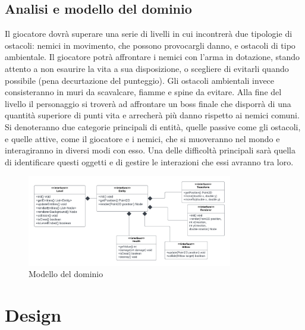 \documentclass[a4paper,12pt]{report}
\begin{document}
\section{Analisi e modello del dominio}
Il giocatore dovrà superare una serie di livelli in cui incontrerà due tipologie di ostacoli: nemici in movimento, che possono provocargli danno, e ostacoli di tipo ambientale.
Il giocatore potrà affrontare i nemici con l'arma in dotazione, stando attento a non esaurire la vita a sua disposizione, o scegliere di evitarli quando possibile (pena decurtazione del punteggio).
Gli ostacoli ambientali invece consisteranno in muri da scavalcare, fiamme e spine da evitare.
Alla fine del livello il personaggio si troverà ad affrontare un boss finale che disporrà di una quantità superiore di punti vita e arrecherà più danno rispetto ai nemici comuni.
Si denoteranno due categorie principali di entità, quelle passive come gli ostacoli, e quelle attive, come il giocatore e i nemici, che si muoveranno nel mondo e interagiranno in diversi modi con esso. Una delle difficoltà principali sarà quella di identificare questi oggetti e di gestire le interazioni che essi avranno tra loro.

\begin{figure}[ht]
\includegraphics[width=0.8\textwidth]{umlModello.png}
\caption{Modello del dominio}
\label{fig:schgen}
\end{figure}


\chapter{Design}
\end{document}
